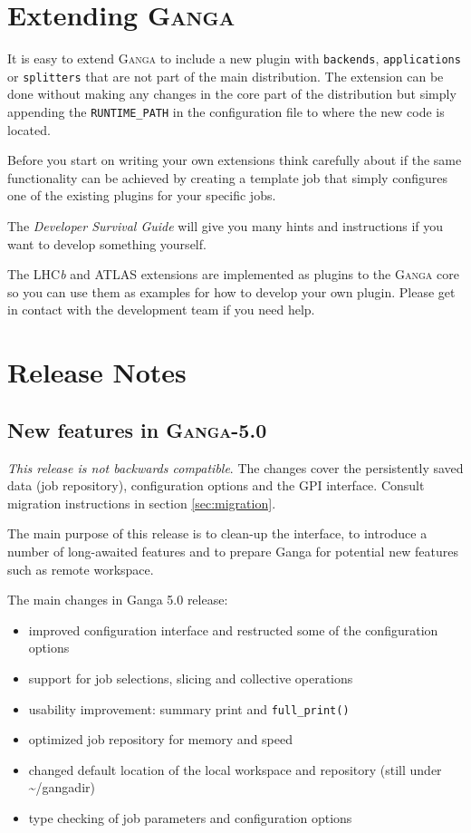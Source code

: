 \documentclass{howto}
\def\ganga {\textsc{Ganga}\xspace}
\def\lhcb {LHC{\em b\/}\xspace}
\def\majorv {5}
\def\minorv {0\xspace}
\def\totalv {\majorv.\minorv}
\def\release{\ganga-\totalv}
\begin{document}
\section{Extending \ganga}
\label{sec:Extending}
It is easy to extend \ganga to include a new plugin with \texttt{backends},
\texttt{applications} or \texttt{splitters} that are not part of the main
distribution. The extension can be done without making any changes in the core
part of the distribution but simply appending the \texttt{RUNTIME_PATH} in the
configuration file to where the new code is located.

Before you start on writing your own extensions think carefully about if the
same functionality can be achieved by creating a template job that simply
configures one of the existing plugins for your specific jobs.

\begin{seealso}
  The \emph{Developer Survival Guide} will give you many hints and
  instructions if you want to develop something yourself.
\end{seealso}

The \lhcb and ATLAS extensions are implemented as plugins to the \ganga core
so you can use them as examples for how to develop your own plugin. Please get
in contact with the development team if you need help.

\section{Release Notes}
\label{ReleaseNotes}

\subsection{New features in \release}

\emph{This release is not backwards compatible}. The changes cover
the persistently saved data (job repository), configuration options and the GPI
interface.  Consult migration instructions in section \ref{sec:migration}.

The main purpose of this release is to clean-up the interface, to
introduce a number of long-awaited features and to prepare Ganga for
potential new features such as remote workspace.

The main changes in Ganga 5.0 release:
\begin{itemize}
\item improved configuration interface and restructed some of the configuration options
\item support for job selections, slicing and collective operations
\item usability improvement: summary print and \texttt{full_print()}
\item optimized job repository for memory and speed
\item changed default location of the local workspace and repository (still under \~{}/gangadir)
\item type checking of job parameters and configuration options
\end{itemize}
\end{document}
